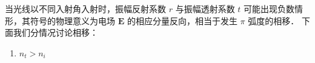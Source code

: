 
\begin{issues}

\end{issues}


当光线以不同入射角入射时，振幅反射系数 $r$ 与振幅透射系数 $t$  可能出现负数情形，其符号的物理意义为电场 $\boldsymbol{E}$ 的相应分量反向，相当于发生 $\pi$ 弧度的相移．
下面我们分情况讨论相移：
\begin{enumerate}
\item $n_t > n_i$


\end{enumerate}

